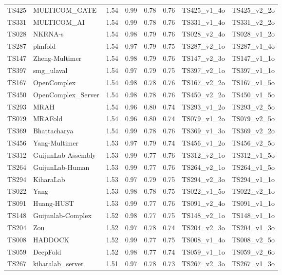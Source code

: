 \begin{table}[ht]
{\begin{tabular}{llllllll}
TS425 & MULTICOM\_GATE & 1.54 & 0.99 & 0.78 & 0.76 & TS425\_v1\_4o & TS425\_v2\_2o \\ 
TS331 & MULTICOM\_AI & 1.54 & 0.99 & 0.78 & 0.76 & TS331\_v1\_4o & TS331\_v2\_2o \\ 
TS028 & NKRNA-s & 1.54 & 0.98 & 0.79 & 0.76 & TS028\_v2\_4o & TS028\_v1\_2o \\ 
TS287 & plmfold & 1.54 & 0.97 & 0.79 & 0.75 & TS287\_v2\_1o & TS287\_v1\_4o \\ 
TS147 & Zheng-Multimer & 1.54 & 0.98 & 0.79 & 0.76 & TS147\_v2\_3o & TS147\_v1\_1o \\ 
TS397 & smg\_ulaval & 1.54 & 0.97 & 0.79 & 0.75 & TS397\_v2\_1o & TS397\_v1\_1o \\ 
TS167 & OpenComplex & 1.54 & 0.98 & 0.78 & 0.76 & TS167\_v2\_2o & TS167\_v1\_5o \\ 
TS450 & OpenComplex\_Server & 1.54 & 0.98 & 0.78 & 0.76 & TS450\_v2\_2o & TS450\_v1\_5o \\ 
TS293 & MRAH & 1.54 & 0.96 & 0.80 & 0.74 & TS293\_v1\_2o & TS293\_v2\_5o \\ 
TS079 & MRAFold & 1.54 & 0.96 & 0.80 & 0.74 & TS079\_v1\_2o & TS079\_v2\_5o \\ 
TS369 & Bhattacharya & 1.54 & 0.99 & 0.78 & 0.76 & TS369\_v1\_3o & TS369\_v2\_2o \\ 
TS456 & Yang-Multimer & 1.53 & 0.97 & 0.79 & 0.74 & TS456\_v1\_2o & TS456\_v2\_5o \\ 
TS312 & GuijunLab-Assembly & 1.53 & 0.99 & 0.77 & 0.76 & TS312\_v2\_1o & TS312\_v1\_5o \\ 
TS264 & GuijunLab-Human & 1.53 & 0.99 & 0.77 & 0.76 & TS264\_v2\_1o & TS264\_v1\_5o \\ 
TS294 & KiharaLab & 1.53 & 0.97 & 0.79 & 0.75 & TS294\_v2\_3o & TS294\_v1\_1o \\ 
TS022 & Yang & 1.53 & 0.98 & 0.78 & 0.75 & TS022\_v1\_5o & TS022\_v2\_1o \\ 
TS091 & Huang-HUST & 1.53 & 0.99 & 0.77 & 0.76 & TS091\_v2\_4o & TS091\_v1\_1o \\ 
TS148 & Guijunlab-Complex & 1.52 & 0.98 & 0.77 & 0.75 & TS148\_v2\_1o & TS148\_v1\_1o \\ 
TS204 & Zou & 1.52 & 0.97 & 0.78 & 0.74 & TS204\_v2\_3o & TS204\_v1\_3o \\ 
TS008 & HADDOCK & 1.52 & 0.99 & 0.77 & 0.75 & TS008\_v1\_4o & TS008\_v2\_5o \\ 
TS059 & DeepFold & 1.52 & 0.98 & 0.77 & 0.74 & TS059\_v1\_1o & TS059\_v2\_6o \\ 
TS267 & kiharalab\_server & 1.51 & 0.97 & 0.78 & 0.73 & TS267\_v2\_3o & TS267\_v1\_3o \\ 

\end{tabular}}
\end{table}
